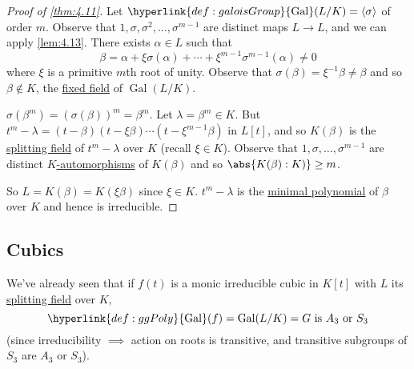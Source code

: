 \documentclass{article}
\DeclareMathOperator{\Gal}{Gal}
\begin{document}
\begin{proof}[Proof of \cref{thm:4.11}]
    Let $\hyperlink{def:galoisGroup}{\Gal}(L/K) = \langle \sigma \rangle$ of order $m$.
    Observe that $1, \sigma, \sigma^2, \dotsc, \sigma^{m-1}$ are distinct maps $L \to L$, and we can apply \cref{lem:4.13}.
    There exists $\alpha \in L$ such that
    \begin{equation*}
        \beta = \alpha + \xi \sigma(\alpha) + \dotsb + \xi^{m-1} \sigma^{m-1}(\alpha) \neq 0
    \end{equation*}
    where $\xi$ is a primitive $m$th root of unity.
    Observe that $\sigma(\beta) = \xi^{-1} \beta \neq \beta$ and so $\beta \notin K$, the \hyperlink{def:fixedField}{fixed field} of $\Gal(L/K)$.

    $\sigma(\beta^m) = (\sigma(\beta))^m = \beta^m$. Let $\lambda = \beta^m \in K$.
    But $t^m - \lambda = (t-\beta)(t-\xi\beta)\dotsm(t-\xi^{m-1}\beta)$ in $L[t]$, and so $K(\beta)$ is the \hyperlink{def:splitting}{splitting field} of $t^m - \lambda$ over $K$ (recall $\xi \in K$).
    Observe that $1, \sigma, \dotsc, \sigma^{m-1}$ are distinct \hyperlink{def:homo}{$K$-automorphisms} of $K(\beta)$ and so $\abs{K(\beta):K)} \geq m$.

    So $L = K(\beta) = K(\xi\beta)$ since $\xi \in K$.
    $t^m - \lambda$ is the \hyperlink{def:minimalPoly}{minimal polynomial} of $\beta$ over $K$ and hence is irreducible.
\end{proof}


\subsection{Cubics}
We've already seen that if $f(t)$ is a monic irreducible cubic in $K[t]$ with $L$ its \hyperlink{def:splitting}{splitting field} over $K$,
\begin{equation*}
    \hyperlink{def:ggPoly}{\Gal}(f) = \Gal(L/K) = G \text{ is } A_3 \text{ or } S_3
\end{equation*}
(since irreducibility $\implies$ action on roots is transitive, and transitive subgroups of $S_3$ are $A_3$ or $S_3$).
\end{document}
